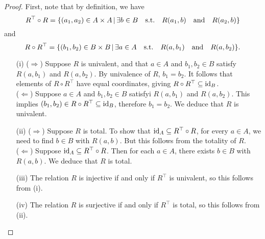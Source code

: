 \begin{proof}
	First, note that by definition, we have
	\[
		R^{\top} \circ R = \{ (a_1,a_2) \in A \times A \, | \, \exists b \in B \quad \text{s.t.} \quad R(a_1,b) \quad \text{and} \quad R(a_2,b) \}
	\]
	and
	\[
		R \circ R^{\top} = \{ (b_1,b_2) \in B \times B \, | \, \exists a \in A \quad \text{s.t.} \quad R(a,b_1) \quad \text{and} \quad R(a,b_2) \}.
	\]
	\begin{itemize}
		\item[(i)] ($\Rightarrow$) Suppose $R$ is univalent, and that $a \in A$ and $b_1,b_2 \in B$ satisfy $R(a,b_1)$ and $R(a,b_2)$. By univalence of $R$, $b_1 = b_2$. It follows that elements of $R \circ R^{\top}$ have equal coordinates, giving $R \circ R^{\top} \subseteq \operatorname{\mathrm{id}}_{B}$.
		\\
		
		($\Leftarrow$) Suppose $a \in A$ and $b_1,b_2 \in B$ satisfyi $R(a,b_1)$ and $R(a,b_2)$. This implies $(b_1,b_2) \in R \circ R^{\top} \subseteq \operatorname{\mathrm{id}}_{B}$, therefore $b_1 = b_2$. We deduce that $R$ is univalent. 
		\\

		\item[(ii)] ($\Rightarrow$) Suppose $R$ is total. To show that $\operatorname{\mathrm{id}}_{A} \subseteq R^{\top} \circ R$, for every $a \in A$, we need to find $b \in B$ with $R(a,b)$. But this follows from the totality of $R$.
		\\

		($\Leftarrow$) Suppose $\operatorname{\mathrm{id}}_{A} \subseteq R^{\top} \circ R$. Then for each $a \in A$, there exists $b \in B$ with $R(a,b)$. We deduce that $R$ is total.
		\\

		\item[(iii)] The relation $R$ is injective if and only if $R^{\top}$ is univalent, so this follows from (i).
		\\

		\item[(iv)] The relation $R$ is surjective if and only if $R^{\top}$ is total, so this follows from (ii).
	\end{itemize}
\end{proof}

